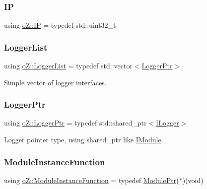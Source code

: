 \mbox{\label{namespaceo_z_ace55c2d0182a14ceea9649d0d0cf9c4a}} 
\subsubsection{\texorpdfstring{IP}{IP}}
{\footnotesize\ttfamily using \mbox{\hyperlink{namespaceo_z_ace55c2d0182a14ceea9649d0d0cf9c4a}{o\+Z\+::\+IP}} = typedef std\+::uint32\+\_\+t}

\mbox{\label{namespaceo_z_a2d18a70272709242e8e7ebffc3f1806c}} 
\subsubsection{\texorpdfstring{LoggerList}{LoggerList}}
{\footnotesize\ttfamily using \mbox{\hyperlink{namespaceo_z_a2d18a70272709242e8e7ebffc3f1806c}{o\+Z\+::\+Logger\+List}} = typedef std\+::vector$<$\mbox{\hyperlink{namespaceo_z_aaa2fbabbfafc6616a7e69651b62a3d4e}{Logger\+Ptr}}$>$}



Simple vector of logger interfaces. 

\mbox{\label{namespaceo_z_aaa2fbabbfafc6616a7e69651b62a3d4e}} 
\subsubsection{\texorpdfstring{LoggerPtr}{LoggerPtr}}
{\footnotesize\ttfamily using \mbox{\hyperlink{namespaceo_z_aaa2fbabbfafc6616a7e69651b62a3d4e}{o\+Z\+::\+Logger\+Ptr}} = typedef std\+::shared\+\_\+ptr$<$\mbox{\hyperlink{classo_z_1_1_i_logger}{I\+Logger}}$>$}



Logger pointer type, using shared\+\_\+ptr like \mbox{\hyperlink{classo_z_1_1_i_module}{I\+Module}}. 

\mbox{\label{namespaceo_z_ac1fa0fdab4bd08a5e127651d1f4150a2}} 
\subsubsection{\texorpdfstring{ModuleInstanceFunction}{ModuleInstanceFunction}}
{\footnotesize\ttfamily using \mbox{\hyperlink{namespaceo_z_ac1fa0fdab4bd08a5e127651d1f4150a2}{o\+Z\+::\+Module\+Instance\+Function}} = typedef \mbox{\hyperlink{namespaceo_z_af5a56aaaee027504979038f38991adcf}{Module\+Ptr}}($\ast$)(void)}




